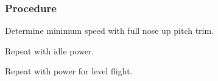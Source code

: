 % 
% 
%
\subsubsection*{Procedure}
  \begin{compactenum}
    \item Determine minimum speed with full nose up pitch trim.
    \item Repeat with idle power.
    \item Repeat with power for level flight.
    \end{compactenum}
